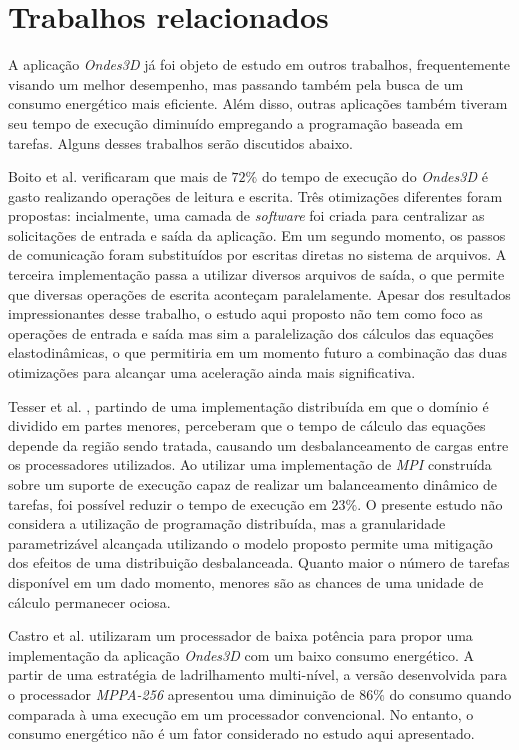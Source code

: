 \documentclass[cic,tc]{iiufrgs}
\begin{document}
\chapter{Trabalhos relacionados}

A aplicação \textit{Ondes3D} já foi objeto de estudo em outros trabalhos, frequentemente visando um melhor desempenho, mas passando também pela busca de um consumo energético 
mais eficiente. Além disso, outras aplicações também tiveram seu tempo de execução diminuído empregando a programação baseada em tarefas. Alguns desses trabalhos serão discutidos abaixo.

Boito et al. \cite{boito} verificaram que mais de $72\%$ do tempo de execução do \textit{Ondes3D} é gasto realizando operações de leitura e escrita. Três otimizações diferentes foram
propostas: incialmente, uma camada de \textit{software} foi criada para centralizar as solicitações de entrada e saída da aplicação. Em um segundo momento, os passos de comunicação foram
substituídos por escritas diretas no sistema de arquivos. A terceira implementação passa a utilizar diversos arquivos de saída, o que permite que diversas operações de escrita aconteçam
paralelamente. Apesar dos resultados impressionantes desse trabalho, o estudo aqui proposto não tem como foco as operações de entrada e saída mas sim a paralelização dos cálculos
das equações elastodinâmicas, o que permitiria em um momento futuro a combinação das duas otimizações para alcançar uma aceleração ainda mais significativa.

Tesser et al. \cite{dupros:hal-00797682}, partindo de uma implementação distribuída em que o domínio é dividido em partes menores,  perceberam que o tempo de cálculo das equações
depende da região sendo tratada, causando um desbalanceamento de cargas entre os processadores utilizados. Ao utilizar uma implementação de \textit{MPI} construída sobre um suporte
de execução capaz de realizar um balanceamento dinâmico de tarefas, foi possível reduzir o tempo de execução em $23\%$. O presente estudo não considera a utilização de programação
distribuída, mas a granularidade parametrizável alcançada utilizando o modelo proposto permite uma mitigação dos efeitos de uma distribuição desbalanceada. Quanto maior o número de tarefas
disponível em um dado momento, menores são as chances de uma unidade de cálculo permanecer ociosa.

Castro et al. \cite{CASTRO2016108} utilizaram um processador de baixa potência para propor uma implementação da aplicação \textit{Ondes3D} com um baixo consumo energético. A partir
de uma estratégia de ladrilhamento multi-nível, a versão desenvolvida para o processador \textit{MPPA-256} apresentou uma diminuição de $86\%$ do consumo quando comparada à uma
execução em um processador convencional. No entanto, o consumo energético não é um fator considerado no estudo aqui apresentado.
\end{document}
